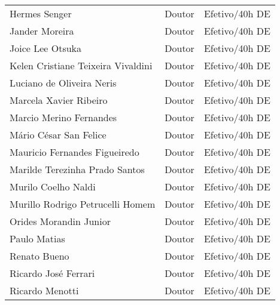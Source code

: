 \begin{singlespace}
\begin{longtable}{lcc}
        Hermes Senger                      & Doutor             & Efetivo/40h DE             \\
        Jander Moreira                     & Doutor             & Efetivo/40h DE             \\
        Joice Lee Otsuka                   & Doutor             & Efetivo/40h DE             \\
        Kelen Cristiane Teixeira Vivaldini & Doutor             & Efetivo/40h DE             \\
        Luciano de Oliveira Neris          & Doutor             & Efetivo/40h DE             \\
        Marcela Xavier Ribeiro             & Doutor             & Efetivo/40h DE             \\
        Marcio Merino Fernandes            & Doutor             & Efetivo/40h DE             \\
        Mário César San Felice             & Doutor             & Efetivo/40h DE             \\
        Mauricio Fernandes Figueiredo      & Doutor             & Efetivo/40h DE             \\
        Marilde Terezinha Prado Santos     & Doutor             & Efetivo/40h DE             \\
        Murilo Coelho Naldi                & Doutor             & Efetivo/40h DE             \\
        Murillo Rodrigo Petrucelli Homem   & Doutor             & Efetivo/40h DE             \\
        Orides Morandin Junior             & Doutor             & Efetivo/40h DE             \\
        Paulo Matias                       & Doutor             & Efetivo/40h DE             \\
        Renato Bueno                       & Doutor             & Efetivo/40h DE             \\
        Ricardo José Ferrari               & Doutor             & Efetivo/40h DE             \\
        Ricardo Menotti                    & Doutor             & Efetivo/40h DE             \\

\end{longtable}
\end{singlespace}
